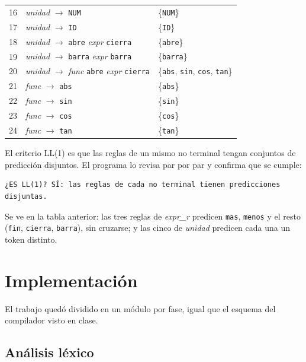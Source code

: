 \documentclass[12pt,letterpaper]{article}
\newcommand{\tk}[1]{\texttt{#1}}
\newcommand{\nt}[1]{\textit{#1}}
\begin{document}
\begin{table}[H]
\begin{tabular}{r l p{6.0cm}}
16 & \textit{unidad} $\rightarrow$ \texttt{NUM} & \{\texttt{NUM}\} \\
17 & \textit{unidad} $\rightarrow$ \texttt{ID} & \{\texttt{ID}\} \\
18 & \textit{unidad} $\rightarrow$ \texttt{abre} \textit{expr} \texttt{cierra} & \{\texttt{abre}\} \\
19 & \textit{unidad} $\rightarrow$ \texttt{barra} \textit{expr} \texttt{barra} & \{\texttt{barra}\} \\
20 & \textit{unidad} $\rightarrow$ \textit{func} \texttt{abre} \textit{expr} \texttt{cierra} & \{\texttt{abs}, \texttt{sin}, \texttt{cos}, \texttt{tan}\} \\
21 & \textit{func} $\rightarrow$ \texttt{abs} & \{\texttt{abs}\} \\
22 & \textit{func} $\rightarrow$ \texttt{sin} & \{\texttt{sin}\} \\
23 & \textit{func} $\rightarrow$ \texttt{cos} & \{\texttt{cos}\} \\
24 & \textit{func} $\rightarrow$ \texttt{tan} & \{\texttt{tan}\} \\
\bottomrule
\end{tabular}
\end{table}

El criterio LL(1) es que las reglas de un mismo no terminal tengan conjuntos de predicción disjuntos. El programa lo revisa par por par y confirma que se cumple:

\begin{lstlisting}
¿ES LL(1)? SÍ: las reglas de cada no terminal tienen predicciones disjuntas.
\end{lstlisting}

Se ve en la tabla anterior: las tres reglas de \nt{expr\_r} predicen \tk{mas}, \tk{menos} y el resto (\tk{fin}, \tk{cierra}, \tk{barra}), sin cruzarse; y las cinco de \nt{unidad} predicen cada una un token distinto.

\section{Implementación}

El trabajo quedó dividido en un módulo por fase, igual que el esquema del compilador visto en clase.

\subsection{Análisis léxico}
\end{document}
